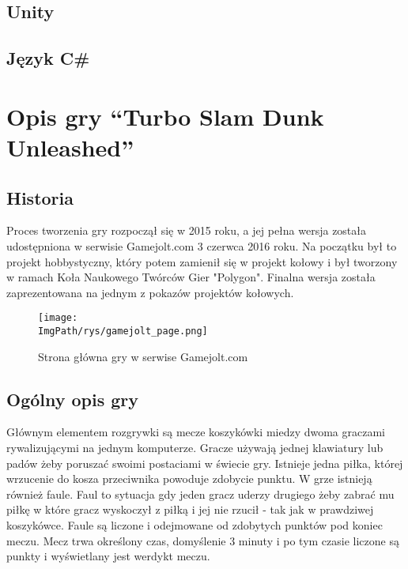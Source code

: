 \documentclass[a4paper,12pt,twoside,openany]{report}
\newcommand{\ImgPath}{.}
\begin{document}
\section{Unity}

\section{Język C\#}

\chapter{Opis gry “Turbo Slam Dunk Unleashed”}

\section{Historia}

Proces tworzenia gry rozpoczął się w 2015 roku, a jej pełna wersja została udostępniona w serwisie Gamejolt.com 3 czerwca 2016 roku. Na początku był to projekt hobbystyczny, który potem zamienił się w projekt kołowy i był tworzony w ramach Koła Naukowego Twórców Gier "Polygon". Finalna wersja została zaprezentowana na jednym z pokazów projektów kołowych.
\begin{figure}[!htbp]
	\begin{center}
\centering
\texttt{[image: \\ImgPath/rys/gamejolt\_page.png]}
\end{center}
	\caption{Strona główna gry w serwise Gamejolt.com}
	\label{gamejolt_page}
\end{figure}

\section{Ogólny opis gry}
Głównym elementem rozgrywki są mecze koszykówki miedzy dwoma graczami rywalizującymi na jednym komputerze. Gracze używają jednej klawiatury lub padów żeby poruszać swoimi postaciami w świecie gry. Istnieje jedna piłka, której wrzucenie do kosza przeciwnika powoduje zdobycie punktu. W grze istnieją również faule. Faul to sytuacja gdy jeden gracz uderzy drugiego żeby zabrać mu piłkę  w które gracz wyskoczył z piłką i jej nie rzucił - tak jak w prawdziwej koszykówce. Faule są liczone i odejmowane od zdobytych punktów pod koniec meczu. Mecz trwa określony czas, domyślenie 3 minuty i po tym czasie liczone są punkty i wyświetlany jest werdykt meczu.
\end{document}
